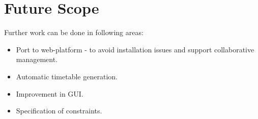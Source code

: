 %

\chapter{Future Scope}
Further work can be done in following areas:
\begin{itemize}
\item Port to web-platform - to avoid installation issues and support collaborative management.
\item Automatic timetable generation. 
\item Improvement in GUI.
\item Specification of constraints.
\end{itemize}
			


 
 
